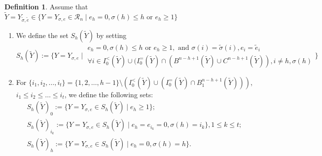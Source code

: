 \documentclass[11pt,oneside]{amsart}
\theoremstyle{plain}
\theoremstyle{definition}
\newtheorem{definition}[theorem]{Definition}
\theoremstyle{remark}
\newcommand{\CR}{{\mathcal R}}
\numberwithin{equation}{section}
\begin{document}
	\begin{definition}\label{definition2.11}Assume that $\widetilde{Y}=Y_{\widetilde{\sigma},\widetilde{e}} \in \lbrace Y=Y_{\sigma,e}\in \CR_n \mid e_h=0, \sigma(h)\leq h \text{ or } e_h \geq 1 \rbrace$ 
		\begin{enumerate}
			\item We define the set $S_h(\widetilde{Y})$ by setting
			\begin{equation*}
				S_h(\widetilde{Y}):=\lbrace Y=Y_{\sigma,e} \mid \begin{array}{c}
					e_h=0, \sigma(h) \leq h \text{ or } e_h \geq 1, \text{ and  } \sigma(i)=\widetilde{\sigma}(i), e_i=\widetilde{e}_i \\
					\forall i \in I_0^{<}(\widetilde{Y}) \cup (I_0^{=}(\widetilde{Y}) \cap (B^{n-h+1}(\widetilde{Y}) \cup C^{n-h+1}(\widetilde{Y})), i \neq h, \sigma(h) \end{array}\rbrace
			\end{equation*}
			
			\item For $\lbrace i_1,i_2,\dots,i_t \rbrace= \lbrace 1,2,\dots,h-1\rbrace \setminus (I_0^<(\widetilde{Y}) \cup (I_0^{=}(\widetilde{Y}) \cap B_1^{n-h+1}(\widetilde{Y})))$, $i_1 \leq i_2 \leq \dots \leq i_t$, we define the following sets:
			\begin{equation*}\begin{array}{l}
					S_{h}(\widetilde{Y})_0:=\lbrace Y=Y_{\sigma,e} \in S_{h}(\widetilde{Y}) \mid e_h \geq 1\rbrace;\\
					S_{h}(\widetilde{Y})_{i_k}:=\lbrace Y=Y_{\sigma,e} \in S_{h}(\widetilde{Y}) \mid e_h=e_{i_k}=0, \sigma(h)=i_k\rbrace, 1 \leq k \leq t;\\
					S_{h}(\widetilde{Y})_h:=\lbrace Y=Y_{\sigma,e} \in S_{h}(\widetilde{Y}) \mid e_h=0, \sigma(h)=h\rbrace.
				\end{array}
			\end{equation*}
			
		\end{enumerate}
	\end{definition}
	
\end{document}
